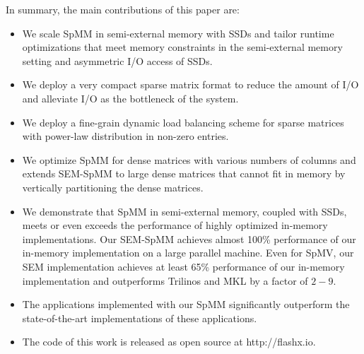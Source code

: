 
In summary, the main contributions of this paper are:
\begin{itemize}
	\item We scale SpMM in semi-external memory with SSDs and tailor runtime
		optimizations that meet memory constraints in the semi-external memory
		setting and asymmetric I/O access of SSDs.
	\item We deploy a very compact sparse matrix format to reduce the amount of
		I/O and alleviate I/O as the bottleneck of the system.
	\item We deploy a fine-grain dynamic load balancing scheme for sparse
		matrices with power-law distribution in non-zero entries.
	\item We optimize SpMM for dense matrices with various numbers of columns
		and extends SEM-SpMM to large dense matrices that cannot fit in memory
		by vertically partitioning the dense matrices.
	\item We demonstrate that SpMM in semi-external memory, coupled with SSDs,
		meets or even exceeds the performance of highly optimized in-memory
		implementations. Our SEM-SpMM achieves almost 100\% performance of our
		in-memory implementation on a large parallel machine. Even for SpMV,
		our SEM implementation achieves at least 65\% performance of our
		in-memory implementation and outperforms Trilinos \cite{trilinos} and
		MKL \cite{mkl} by a factor of $2-9$.
	\item The applications implemented with our SpMM significantly outperform
		the state-of-the-art implementations of these applications.
	\item The code of this work is released as open source at http://flashx.io.
\end{itemize}


